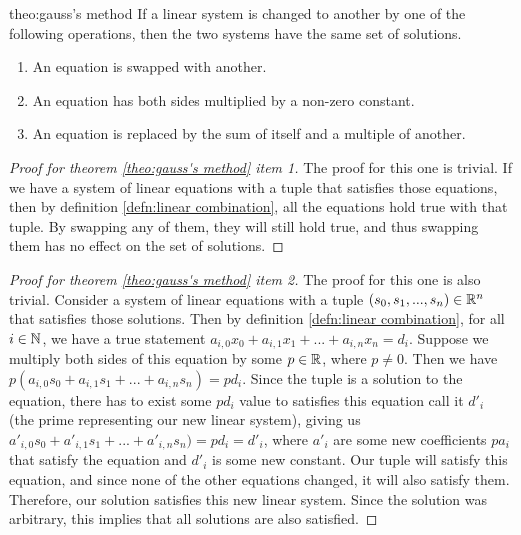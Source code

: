 \begin{theo}{theo:gauss's method}
If a linear system is changed to another by one of the following operations, then the two systems have the same set of solutions.
\begin{enumerate}
	\item An equation is swapped with another.
	\item An equation has both sides multiplied by a non-zero constant.
	\item An equation is replaced by the sum of itself and a multiple of another.
\end{enumerate}
\end{theo}
\begin{proof}[Proof for theorem \ref{theo:gauss's method} item 1]
	The proof for this one is trivial. If we have a system of linear equations with a tuple that satisfies those equations, then by definition \ref{defn:linear combination}, all the equations hold true with that tuple. By swapping any of them, they will still hold true, and thus swapping them has no effect on the set of solutions.
\end{proof}
\begin{proof}[Proof for theorem \ref{theo:gauss's method} item 2]
	The proof for this one is also trivial. Consider a system of linear equations with a tuple $(s_0, s_1,..., s_n) \in{\mathbb R}^n$ that satisfies those solutions. Then by definition \ref{defn:linear combination}, for all $i\in{\mathbb N}$, we have a true statement $a_{i,0}x_0 + a_{i,1}x_1 + ... + a_{i,n}x_n = d_i$. Suppose we multiply both sides of this equation by some $p\in{\mathbb R}$, where $p \neq 0$. Then we have $p(a_{i,0}s_0 + a_{i,1}s_1 + ... + a_{i,n}s_n)= pd_i$. Since the tuple is a solution to the equation, there has to exist some $pd_i$ value to satisfies this equation call it $d'_i$ (the prime representing our new linear system), giving us $a'_{i,0}s_0 + a'_{i,1}s_1 + ... + a'_{i,n}s_n) = pd_i = d'_i$, where $a'_i$ are some new coefficients $pa_i$ that satisfy the equation and $d'_i$ is some new constant. Our tuple will satisfy this equation, and since none of the other equations changed, it will also satisfy them. Therefore, our solution satisfies this new linear system. Since the solution was arbitrary, this implies that all solutions are also satisfied.
\end{proof}
